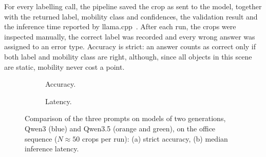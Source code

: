 {\small For every labelling call, the pipeline saved the crop as sent to the model, together with the returned label, mobility class and confidences, the validation result and the inference time reported by llama.cpp~\cite{llamacpp}. After each run, the crops were inspected manually, the correct label was recorded and every wrong answer was assigned to an error type. Accuracy is strict: an answer counts as correct only if both label and mobility class are right, although, since all objects in this scene are static, mobility never cost a point.\par}

\begin{figure}[!htb]
	\centering
	\begin{subfigure}[t]{0.48\linewidth}
		\centering
		\caption{Accuracy.}
		\label{fig:results_vlm_acc}
	\end{subfigure}
	\hfill
	\begin{subfigure}[t]{0.48\linewidth}
		\centering
		\caption{Latency.}
		\label{fig:results_vlm_latency}
	\end{subfigure}

	\vspace{1mm}
	\caption{Comparison of the three prompts on models of two generations, Qwen3 (blue) and Qwen3.5 (orange and green), on the office sequence ($N \approx 50$ crops per run): (a) strict accuracy, (b) median inference latency.}
	\label{fig:results_vlm}
\end{figure}

